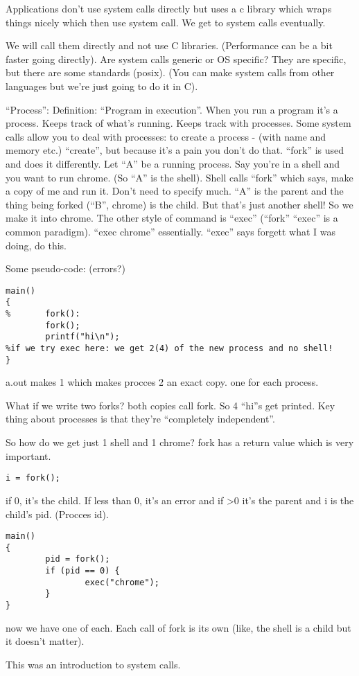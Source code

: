 \documentclass[10pt]{article}
\begin{document}
Applications don't use system calls directly but uses a c library which wraps things nicely which then use system call. We get to system calls eventually. 

We will call them directly and not use C libraries. (Performance can be a bit faster going directly). Are system calls generic or OS specific? They are specific, but there are some standards (posix). (You can make system calls from other languages but we're just going to do it in C). 

``Process'': Definition: ``Program in execution''. When you run a program it's a process. Keeps track of what's running. Keeps track with processes. Some system calls allow you to deal with processes: to create a process - (with name and memory etc.) ``create'', but because it's a pain you don't do that. ``fork'' is used and does it differently. Let ``A'' be a running process. Say you're in a shell and you want to run chrome. (So ``A'' is the shell). Shell calls ``fork'' which says, make a copy of me and run it. Don't need to specify much. ``A'' is the parent and the thing being forked (``B'', chrome) is the child. But that's just another shell! So we make it into chrome. The other style of command is ``exec'' (``fork'' ``exec'' is a common paradigm). ``exec chrome'' essentially. ``exec'' says forgett what I was doing, do this. 

Some pseudo-code: (errors?)

\begin{verbatim}
main()
{
%       fork():
        fork();
        printf("hi\n");
%if we try exec here: we get 2(4) of the new process and no shell!
}
\end{verbatim}


a.out makes 1 which makes procces 2 an exact copy. one for each process.

What if we write two forks? both copies call fork. So 4 ``hi''s get printed. 
Key thing about processes is that they're ``completely independent''. 

So how do we get just 1 shell and 1 chrome?
fork has a return value which is very important. 

\begin{verbatim}
i = fork();
\end{verbatim}

if 0, it's the child. If less than 0, it's an error and if >0 it's the parent and i is the child's pid. (Procces id).

\begin{verbatim}
main()
{
        pid = fork();
        if (pid == 0) {
                exec("chrome");
        }
}
\end{verbatim}

now we have one of each. Each call of fork is its own (like, the shell is a child but it doesn't matter). 


This was an introduction to system calls. 
\end{document}
